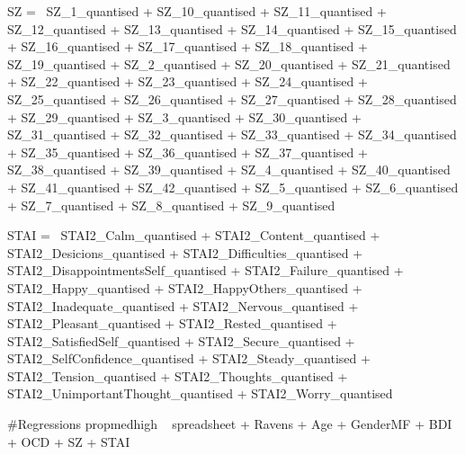 \documentclass[]{article}
\newenvironment{Shaded}{\begin{snugshade}}{\end{snugshade}}
\newcommand{\StringTok}[1]{\textcolor[rgb]{0.31,0.60,0.02}{#1}}
\begin{document}
\begin{Shaded}
\begin{Highlighting}[]
\StringTok{SZ =~ SZ_1_quantised    +}
\StringTok{      SZ_10_quantised   +   }
\StringTok{      SZ_11_quantised + }
\StringTok{      SZ_12_quantised + }
\StringTok{      SZ_13_quantised + }
\StringTok{      SZ_14_quantised + }
\StringTok{      SZ_15_quantised + }
\StringTok{      SZ_16_quantised + }
\StringTok{      SZ_17_quantised + }
\StringTok{      SZ_18_quantised + }
\StringTok{      SZ_19_quantised + }
\StringTok{      SZ_2_quantised + }
\StringTok{      SZ_20_quantised + }
\StringTok{      SZ_21_quantised + }
\StringTok{      SZ_22_quantised + }
\StringTok{      SZ_23_quantised + }
\StringTok{      SZ_24_quantised + }
\StringTok{      SZ_25_quantised + }
\StringTok{      SZ_26_quantised + }
\StringTok{      SZ_27_quantised + }
\StringTok{      SZ_28_quantised + }
\StringTok{      SZ_29_quantised + }
\StringTok{      SZ_3_quantised + }
\StringTok{      SZ_30_quantised + }
\StringTok{      SZ_31_quantised + }
\StringTok{      SZ_32_quantised + }
\StringTok{      SZ_33_quantised + }
\StringTok{      SZ_34_quantised + }
\StringTok{      SZ_35_quantised + }
\StringTok{      SZ_36_quantised + }
\StringTok{      SZ_37_quantised + }
\StringTok{      SZ_38_quantised + }
\StringTok{      SZ_39_quantised + }
\StringTok{      SZ_4_quantised + }
\StringTok{      SZ_40_quantised + }
\StringTok{      SZ_41_quantised + }
\StringTok{      SZ_42_quantised + }
\StringTok{      SZ_5_quantised + }
\StringTok{      SZ_6_quantised + }
\StringTok{      SZ_7_quantised + }
\StringTok{      SZ_8_quantised + }
\StringTok{      SZ_9_quantised}

\StringTok{STAI =~ STAI2_Calm_quantised +}
\StringTok{        STAI2_Content_quantised +}
\StringTok{        STAI2_Desicions_quantised +}
\StringTok{        STAI2_Difficulties_quantised +}
\StringTok{        STAI2_DisappointmentsSelf_quantised +}
\StringTok{        STAI2_Failure_quantised +}
\StringTok{        STAI2_Happy_quantised +}
\StringTok{        STAI2_HappyOthers_quantised +}
\StringTok{        STAI2_Inadequate_quantised +}
\StringTok{        STAI2_Nervous_quantised +}
\StringTok{        STAI2_Pleasant_quantised +}
\StringTok{        STAI2_Rested_quantised +}
\StringTok{        STAI2_SatisfiedSelf_quantised +}
\StringTok{        STAI2_Secure_quantised +}
\StringTok{        STAI2_SelfConfidence_quantised +}
\StringTok{        STAI2_Steady_quantised +}
\StringTok{        STAI2_Tension_quantised +}
\StringTok{        STAI2_Thoughts_quantised +}
\StringTok{        STAI2_UnimportantThought_quantised +}
\StringTok{        STAI2_Worry_quantised}


\StringTok{#Regressions}
\StringTok{propmedhigh ~ spreadsheet + Ravens + Age + GenderMF + BDI + OCD + SZ + STAI}


\end{Highlighting}
\end{Shaded}
\end{document}
